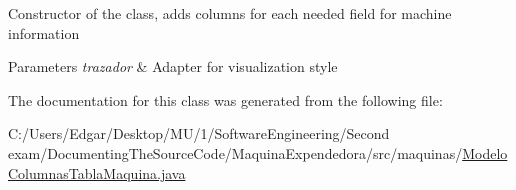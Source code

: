 Constructor of the class, adds columns for each needed field for machine information 
\begin{DoxyParams}{Parameters}
{\em trazador} & Adapter for visualization style \\
\hline
\end{DoxyParams}


The documentation for this class was generated from the following file\+:\begin{DoxyCompactItemize}
\item 
C\+:/\+Users/\+Edgar/\+Desktop/\+M\+U/1/\+Software\+Engineering/\+Second exam/\+Documenting\+The\+Source\+Code/\+Maquina\+Expendedora/src/maquinas/\mbox{\hyperlink{_modelo_columnas_tabla_maquina_8java}{Modelo\+Columnas\+Tabla\+Maquina.\+java}}\end{DoxyCompactItemize}
